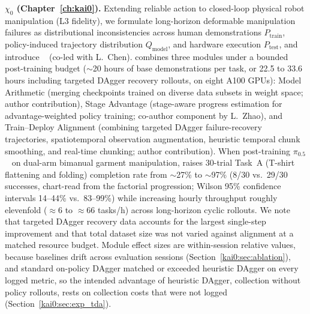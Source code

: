 \noindent\textbf{$\chi_0$ (Chapter~\ref{ch:kai0}).}
Extending reliable action to closed-loop physical robot manipulation (L3 fidelity), we formulate long-horizon deformable manipulation failures as distributional inconsistencies across human demonstrations $P_{\mathrm{train}}$, policy-induced trajectory distribution $Q_{\mathrm{model}}$, and hardware execution $P_{\mathrm{test}}$, and introduce \chiz~\cite{sima2026kai0} (co-led with L.~Chen). \chiz combines three modules under a bounded post-training budget ($\sim$20 hours of base demonstrations per task, or 22.5 to 33.6 hours including targeted DAgger recovery rollouts, on eight A100 GPUs): Model Arithmetic (merging checkpoints trained on diverse data subsets in weight space; author contribution), Stage Advantage (stage-aware progress estimation for advantage-weighted policy training; co-author component by L.~Zhao), and Train--Deploy Alignment (combining targeted DAgger failure-recovery trajectories, spatiotemporal observation augmentation, heuristic temporal chunk smoothing, and real-time chunking; author contribution). When post-training $\pi_{0.5}$~\cite{black2025pi05} on dual-arm bimanual garment manipulation, \chiz raises 30-trial Task~A (T-shirt flattening and folding) completion rate from $\sim$27\% to $\sim$97\% (8/30 vs.\ 29/30 successes, chart-read from the factorial progression; Wilson 95\% confidence intervals 14--44\% vs.\ 83--99\%) while increasing hourly throughput roughly elevenfold ($\approx 6$ to $\approx 66$ tasks/h) across long-horizon cyclic rollouts. We note that targeted DAgger recovery data accounts for the largest single-step improvement and that total dataset size was not varied against alignment at a matched resource budget. Module effect sizes are within-session relative values, because baselines drift across evaluation sessions (Section~\ref{kai0:sec:ablation}), and standard on-policy DAgger matched or exceeded heuristic DAgger on every logged metric, so the intended advantage of heuristic DAgger, collection without policy rollouts, rests on collection costs that were not logged (Section~\ref{kai0:sec:exp_tda}).

